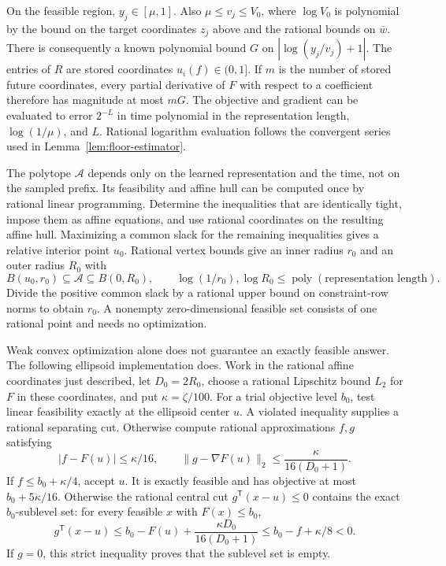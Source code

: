 \documentclass[11pt]{article}
\newcommand{\poly}{\operatorname{poly}}
\theoremstyle{definition}
\theoremstyle{remark}
\begin{document}
On the feasible region, $y_j\in[\mu,1]$. Also $\mu\le v_j\le V_0$, where $\log V_0$ is polynomial by the bound on the target coordinates $z_j$ above and the rational bounds on $\bar w$. There is consequently a known polynomial bound $G$ on $|\log(y_j/v_j)+1|$. The entries of $R$ are stored coordinates $u_i(f)\in(0,1]$. If $m$ is the number of stored future coordinates, every partial derivative of $F$ with respect to a coefficient therefore has magnitude at most $mG$. The objective and gradient can be evaluated to error $2^{-L}$ in time polynomial in the representation length, $\log(1/\mu)$, and $L$. Rational logarithm evaluation follows the convergent series used in Lemma~\ref{lem:floor-estimator}.

The polytope $\mathcal A$ depends only on the learned representation and the time, not on the sampled prefix. Its feasibility and affine hull can be computed once by rational linear programming. Determine the inequalities that are identically tight, impose them as affine equations, and use rational coordinates on the resulting affine hull. Maximizing a common slack for the remaining inequalities gives a relative interior point $u_0$. Rational vertex bounds give an inner radius $r_0$ and an outer radius $R_0$ with
\[
B(u_0,r_0)\subseteq\mathcal A\subseteq B(0,R_0),
\qquad
\log(1/r_0),\log R_0\le\poly(\text{representation length}).
\]
Divide the positive common slack by a rational upper bound on constraint-row norms to obtain $r_0$. A nonempty zero-dimensional feasible set consists of one rational point and needs no optimization.

Weak convex optimization alone does not guarantee an exactly feasible answer. The following ellipsoid implementation does. Work in the rational affine coordinates just described, let $D_0=2R_0$, choose a rational Lipschitz bound $L_2$ for $F$ in these coordinates, and put $\kappa=\zeta/100$. For a trial objective level $b_0$, test linear feasibility exactly at the ellipsoid center $u$. A violated inequality supplies a rational separating cut. Otherwise compute rational approximations $f,g$ satisfying
\[
|f-F(u)|\le\kappa/16,\qquad
\|g-\nabla F(u)\|_2\le\frac{\kappa}{16(D_0+1)}.
\]
If $f\le b_0+\kappa/4$, accept $u$. It is exactly feasible and has objective at most $b_0+5\kappa/16$. Otherwise the rational central cut
$g^{\mathsf T}(x-u)\le0$ contains the exact $b_0$-sublevel set: for every feasible $x$ with $F(x)\le b_0$,
\[
g^{\mathsf T}(x-u)
\le b_0-F(u)+\frac{\kappa D_0}{16(D_0+1)}
\le b_0-f+\kappa/8<0.
\]
If $g=0$, this strict inequality proves that the sublevel set is empty.
\end{document}
